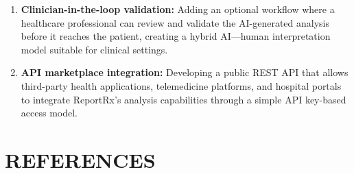 \begin{enumerate}
    \item \textbf{Clinician-in-the-loop validation:} Adding an optional workflow where a healthcare professional can review and validate the AI-generated analysis before it reaches the patient, creating a hybrid AI---human interpretation model suitable for clinical settings.
    \item \textbf{API marketplace integration:} Developing a public REST API that allows third-party health applications, telemedicine platforms, and hospital portals to integrate ReportRx's analysis capabilities through a simple API key-based access model.
\end{enumerate}

\clearpage
{}
\chapter*{REFERENCES}


